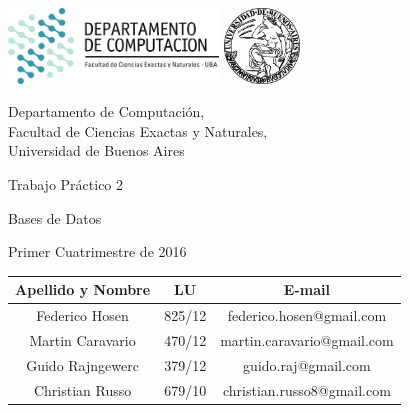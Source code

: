 \documentclass[a4paper, 10pt, twoside]{article}
\newcommand{\titulo}{Trabajo Práctico 2}
\newcommand{\materia}{Bases de Datos}
\newcommand{\cuatrimestre}{Primer Cuatrimestre de 2016}
\begin{document}


\thispagestyle{caratula}

\begin{center}

\includegraphics[height=2cm]{DC.png} 
\hfill
\includegraphics[height=2cm]{UBA.jpg} 

\vspace{2cm}

Departamento de Computación,\\
Facultad de Ciencias Exactas y Naturales,\\
Universidad de Buenos Aires

\vspace{4cm}

\begin{Huge}
\titulo
\end{Huge}

\vspace{0.5cm}

\begin{Large}
\materia
\end{Large}

\vspace{1cm}

\cuatrimestre

\vspace{4cm}

\begin{tabular}{|c|c|c|}
\hline
Apellido y Nombre & LU & E-mail\\
\hline
Federico Hosen  & 825/12 & federico.hosen@gmail.com\\
Martin Caravario  & 470/12 & martin.caravario@gmail.com\\
Guido Rajngewerc  & 379/12 & guido.raj@gmail.com\\
Christian Russo  & 679/10 & christian.russo8@gmail.com\\
\hline
\end{tabular}

\end{center}
\end{document}
